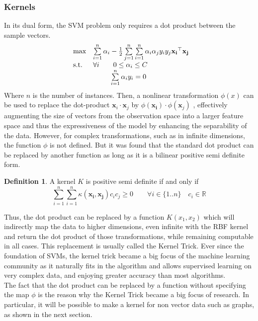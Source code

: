 \documentclass{article}
\let\vec\mathbf
\newcommand*{\R}{%
  \mathbb{R}%
}
\theoremstyle{definition}
\newtheorem{definition}{Definition}
\begin{document}
\subsubsection{Kernels}
In its dual form, the SVM problem only requires a dot product between the sample vectors. 
\begin{equation}
	\begin{array}{ll@{}ll}
	\text{max} & \sum\limits_{i=1}^{n} \alpha_i - \frac{1}{2} \sum\limits_{j=1}^{n}\sum\limits_{i=1}^{n}\alpha_{i}\alpha_{j}y_{i}y_{j}\vec{x_{i}}^{\top}\vec{x_{j}}\\
	\text{s.t.} & \forall i\qquad 0 \leq \alpha_{i} \leq C\\
	& \qquad \;\; \sum\limits_{i=1}^{n} \alpha_{i}y_{i}=0
	\end{array}
\end{equation}
Where $n$ is the number of instances.
Then, a nonlinear transformation $\phi(x)$ can be used to replace the dot-product $\vec{x}_i \cdot \vec{x}_j$ by $\phi(\vec{x_{i}})\cdot\phi(\vec{x}_{j})$ , effectively augmenting the size of vectors from the observation space into a larger feature space and thus the expressiveness of the model by enhancing the separability of the data. However, for complex transformations, such as in infinite dimensions, the function $\phi$ is not defined. But it was found that the standard dot product can be replaced by another function as long as it is a bilinear positive semi definite form. 
\begin{definition}
	A kernel $K$ is positive semi definite if and only if\\
    \begin{equation}
    	\sum\limits_{i=1}^{n}\sum\limits_{i=1}^{n}\kappa(\vec{x_{i}},\vec{x_{j}})c_{i}c_{j} \geq 0 \qquad \forall i \in \{1..n\} \quad c_i \in \R
    \end{equation}
\end{definition}
Thus, the dot product can be replaced by a function $K(x_1,x_2)$ which will indirectly map the data to higher dimensions, even infinite with the RBF kernel and return the dot product of those transformations, while remaining computable in all cases. This replacement is usually called the Kernel Trick.
Ever since the foundation of SVMs, the kernel trick became a big focus of the machine learning community as it naturally fits in the algorithm and allows supervised learning on very complex data, and enjoying greater accuracy than most algorithms.\\
The fact that the dot product can be replaced by a function without specifying the map $\phi$ is the reason why the Kernel Trick became a big focus of research. In particular, it will be possible to make a kernel for non vector data such as graphs, as shown in the next section. 
\end{document}
